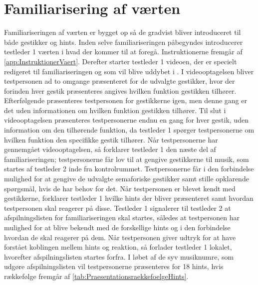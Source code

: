 \section{Familiarisering af værten}
\label{FamiliariseringSocialAccept}
% 
Familiariseringen af værten er bygget op så de gradvist bliver introduceret til både gestikker og hints. Inden selve familiariseringen påbegyndes introducerer testleder 1 værten i hvad der kommer til at foregå. Instruktionerne fremgår af \autoref{app:InstruktionerVaert}. Derefter starter testleder 1 videoen, der er specielt redigeret til familiariseringen og som vil blive uddybet i . I videooptagelsen bliver testpersonen ad to omgange præsenteret for de udvalgte gestikker, hvor der forinden hver gestik præsenteres angives hvilken funktion gestikken tilhører. Efterfølgende præsenteres testpersonen for gestikkerne igen, men denne gang er det uden informationen om hvilken funktion gestikken tilhører. Til slut i videooptagelsen præsenteres testpersonerne endnu en gang for hver gestik, uden information om den tilhørende funktion, da testleder 1 spørger testpersonerne om hvilken funktion den specifikke gestik tilhører. Når testpersonerne har gennemgået videooptagelsen, så forklarer testleder 1 den næste del af familiariseringen; testpersonerne får lov til at gengive gestikkerne til musik, som startes af testleder 2 inde fra kontrolrummet. Testpersonerne får i den forbindelse mulighed for at gengive de udvalgte semaforiske gestikker samt stille opklarende spørgsmål, hvis de har behov for det. Når testpersonen er blevet kendt med gestikkerne, forklarer testleder 1 hvilke hints der bliver præsenteret samt hvordan testpersonen skal reagerer på disse. Testleder 1 signalerer til testleder 2 at afspilningslisten for familiariseringen skal startes, således at testpersonen har mulighed for at blive bekendt med de forskellige hints og i den forbindelse hvordan de skal reagerer på dem. Når testpersonen giver udtryk for at have forstået koblingen mellem hints og reaktion, så forlader testleder 1 lokalet, hvorefter afspilningslisten startes forfra. I løbet af de syv musiknumre, som udgøre afspilningslisten vil testpersonerne præsenteres for 18 hints, hvis rækkefølge fremgår af \autoref{tab:PraesentationsraekkefoelgeHints}.

